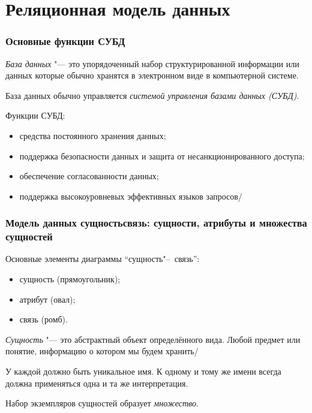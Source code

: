 \part{Реляционная модель данных}

\section{Основные функции СУБД}

\begin{definition}
	\emph{База данных} "--- это упорядоченный набор структурированной информации или данных которые обычно хранятся в электронном виде в компьютерной системе.
\end{definition}

База данных обычно управляется \emph{системой управления базами данных (СУБД)}.

Функции СУБД:
\begin{itemize}
	\item средства постоянного хранения данных;
	\item поддержка безопасности данных и защита от несанкционированного доступа;
	\item обеспечение согласованности данных;
	\item поддержка высокоуровневых эффективных языков запросов/
\end{itemize}

\section{Модель данных сущностьсвязь: сущности, атрибуты и множества сущностей}

Основные элементы диаграммы ``сущность"--~связь'':
\begin{itemize}
	\item сущность (прямоугольник);
	\item атрибут (овал);
	\item связь (ромб).
\end{itemize}

\begin{definition}
	\emph{Сущность} "--- это абстрактный объект определённого вида.
	Любой предмет или понятие, информацию о котором мы будем хранить/
\end{definition}

У каждой должно быть уникальное имя.
К одному и тому же имени всегда должна применяться одна и та же интерпретация.

\begin{definition}
	Набор экземпляров сущностей образует \emph{множество}.
\end{definition}

